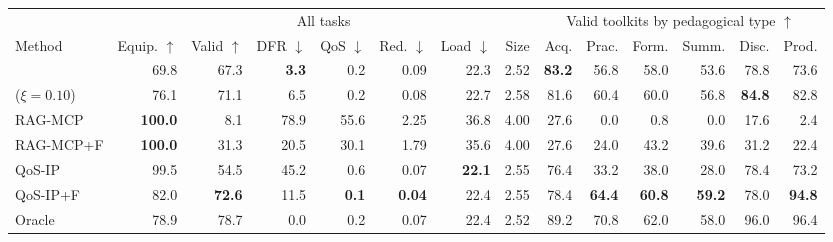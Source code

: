 \begin{tabular}{lrrrrrrrrrrrrr}\toprule
& \multicolumn{7}{c}{All tasks} & \multicolumn{6}{c}{Valid toolkits by pedagogical type $\uparrow$} \\ \cmidrule(lr){2-8}\cmidrule(lr){9-14}
Method & Equip. $\uparrow$ & Valid $\uparrow$ & DFR $\downarrow$ & QoS $\downarrow$ & Red. $\downarrow$ & Load $\downarrow$ & Size & Acq. & Prac. & Form. & Summ. & Disc. & Prod. \\ \midrule
\sysname{} & 69.8 & 67.3 & \textbf{3.3} & 0.2 & 0.09 & 22.3 & 2.52 & \textbf{83.2} & 56.8 & 58.0 & 53.6 & 78.8 & 73.6 \\
\sysname{} ($\xi{=}0.10$) & 76.1 & 71.1 & 6.5 & 0.2 & 0.08 & 22.7 & 2.58 & 81.6 & 60.4 & 60.0 & 56.8 & \textbf{84.8} & 82.8 \\
RAG-MCP & \textbf{100.0} & 8.1 & 78.9 & 55.6 & 2.25 & 36.8 & 4.00 & 27.6 & 0.0 & 0.8 & 0.0 & 17.6 & 2.4 \\
RAG-MCP+F & \textbf{100.0} & 31.3 & 20.5 & 30.1 & 1.79 & 35.6 & 4.00 & 27.6 & 24.0 & 43.2 & 39.6 & 31.2 & 22.4 \\
QoS-IP & 99.5 & 54.5 & 45.2 & 0.6 & 0.07 & \textbf{22.1} & 2.55 & 76.4 & 33.2 & 38.0 & 28.0 & 78.4 & 73.2 \\
QoS-IP+F & 82.0 & \textbf{72.6} & 11.5 & \textbf{0.1} & \textbf{0.04} & 22.4 & 2.55 & 78.4 & \textbf{64.4} & \textbf{60.8} & \textbf{59.2} & 78.0 & \textbf{94.8} \\
\midrule
Oracle & 78.9 & 78.7 & 0.0 & 0.2 & 0.07 & 22.4 & 2.52 & 89.2 & 70.8 & 62.0 & 58.0 & 96.0 & 96.4 \\
\bottomrule\end{tabular}

